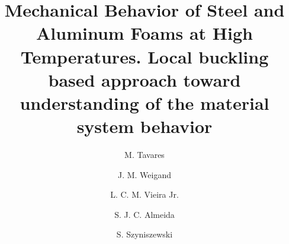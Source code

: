 \documentclass[review]{elsarticle}
\begin{document}
\begin{frontmatter}

\title{Mechanical Behavior of Steel and Aluminum Foams at High Temperatures. Local buckling based approach toward understanding of the material system behavior}


\author[mymainaddress]{M. Tavares}
\author[mysecondaryaddress]{J. M. Weigand}
\author[mymainaddress]{L. C. M. Vieira Jr.}
\author[mymainaddress]{S. J. C. Almeida}
\author[mythirdaddress]{S. Szyniszewski}

\address[mymainaddress]{Department of Structural Engineering, State University of Campinas, Campinas, Brazil}
\address[mysecondaryaddress]{National Institute of Standards and Technology (NIST), Gaithersburg, Maryland, USA}
\address[mythirdaddress]{Department of Engineering, Durham University, Durham, UK}



\end{frontmatter}
\end{document}

